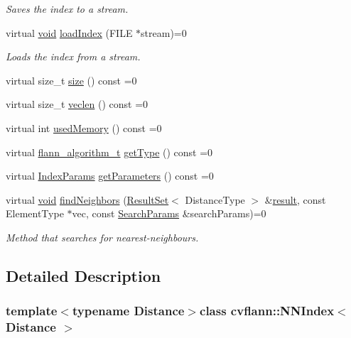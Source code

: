 \begin{DoxyCompactItemize}
\begin{DoxyCompactList}\small\item\em Saves the index to a stream. \end{DoxyCompactList}\item 
virtual \hyperlink{legacy_8hpp_a8bb47f092d473522721002c86c13b94e}{void} \hyperlink{classcvflann_1_1NNIndex_a4bcaf48ee2ac65a1b3cebea99d021611}{load\-Index} (F\-I\-L\-E $\ast$stream)=0
\begin{DoxyCompactList}\small\item\em Loads the index from a stream. \end{DoxyCompactList}\item 
virtual size\-\_\-t \hyperlink{classcvflann_1_1NNIndex_ae75fd979d25a239b4aba751114493fe0}{size} () const =0
\item 
virtual size\-\_\-t \hyperlink{classcvflann_1_1NNIndex_acdcc255d1b67d5636a0f76b68809e6be}{veclen} () const =0
\item 
virtual int \hyperlink{classcvflann_1_1NNIndex_ac172cb3774f8ae39ff1107bee4fadbf9}{used\-Memory} () const =0
\item 
virtual \hyperlink{namespacecvflann_a4e3e6c98d774ea77fd7f0045c9bc7817}{flann\-\_\-algorithm\-\_\-t} \hyperlink{classcvflann_1_1NNIndex_ac40469dbc16bcb0fb4b0c9912c5f8acb}{get\-Type} () const =0
\item 
virtual \hyperlink{namespacecvflann_a742b4c7076c21012054af74a9ee48289}{Index\-Params} \hyperlink{classcvflann_1_1NNIndex_afbc22ebf77f4f376d9e7922727d0abfe}{get\-Parameters} () const =0
\item 
virtual \hyperlink{legacy_8hpp_a8bb47f092d473522721002c86c13b94e}{void} \hyperlink{classcvflann_1_1NNIndex_ac038c51dc941c7c1a55b08c17e213e41}{find\-Neighbors} (\hyperlink{classcvflann_1_1ResultSet}{Result\-Set}$<$ Distance\-Type $>$ \&\hyperlink{legacy_8hpp_a0bb77d54f6769867cfdf389897bd8e43}{result}, const Element\-Type $\ast$vec, const \hyperlink{structcvflann_1_1SearchParams}{Search\-Params} \&search\-Params)=0
\begin{DoxyCompactList}\small\item\em Method that searches for nearest-\/neighbours. \end{DoxyCompactList}\end{DoxyCompactItemize}


\subsection{Detailed Description}
\subsubsection*{template$<$typename Distance$>$class cvflann\-::\-N\-N\-Index$<$ Distance $>$}

